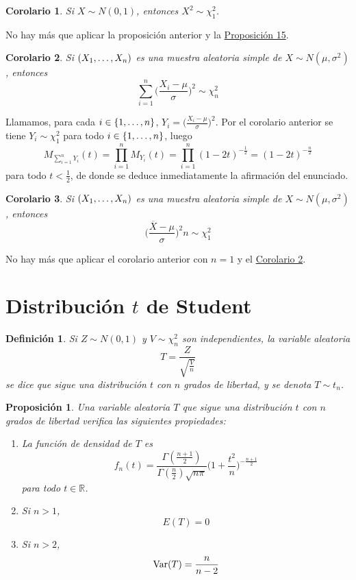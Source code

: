 \documentclass[11pt]{report}
\makeatletter
\renewenvironment{proof}[1][\proofname]{\par
  \pushQED{\qed}%
  \normalfont \topsep\z@skip %
  \trivlist
  \item[\hskip\labelsep
        \itshape
    #1\@addpunct{.}]\ignorespaces
}{%
  \popQED\endtrivlist\@endpefalse
}
\newtheorem{proposition}{Proposición}
\newtheorem{corollary}{Corolario} %
\newtheorem{definition}{Definición}
\theoremstyle{definition}
\newcommand{\R}{\mathbb R}
\makeatother
\begin{document}
\begin{corollary}
Si $X \sim N(0,1)$, entonces $X^2 \sim \chi^2_1$.
\end{corollary}

\begin{proof}
No hay más que aplicar la proposición anterior y la \hyperref[prop2.11]{\color{blue}Proposición 15}.
\end{proof}

\begin{corollary}
\label{cor2.17}
Si $(X_1,\mathellipsis,X_n)$ es una muestra aleatoria simple de $X \sim N(\mu,\sigma^2)$, entonces
    \[\sum_{i=1}^n\bigl(\frac{X_i-\mu}{\sigma}\bigr)^2 \sim \chi^2_n\]
\end{corollary}

\begin{proof}
Llamamos, para cada $i \in \{1,\mathellipsis,n\}$, $Y_i = \bigl(\frac{X_i-\mu}{\sigma}\bigr)^2$. Por el corolario anterior se tiene $Y_i\sim \chi^2_1$ para todo $i \in \{1,\mathellipsis,n\}$, luego
\[M_{\sum_{i=1}^nY_i}(t) = \prod_{i=1}^nM_{Y_i}(t)= \prod_{i=1}^n(1-2t)^{-\frac{1}{2}} = (1-2t)^{-\frac{n}{2}}\]
para todo $t < \frac{1}{2}$, de donde se deduce inmediatamente la afirmación del enunciado.
\end{proof}

\begin{corollary}
\label{cor2.18}
Si $(X_1,\mathellipsis,X_n)$ es una muestra aleatoria simple de $X \sim N(\mu,\sigma^2)$, entonces
\[\bigl(\frac{\overline{X}-\mu}{\sigma}\bigr)^2n \sim \chi^2_1\]
\end{corollary}

\begin{proof}
No hay más que aplicar el corolario anterior con $n=1$ y el \hyperref[cor2.6]{\color{blue}Corolario 2}.
\end{proof}

\section{Distribución \texorpdfstring{$t$}{TEXT} de Student}

\begin{definition}
Si $Z \sim N(0,1)$ y $V \sim \chi^2_n$ son independientes, la variable aleatoria
\[T= \frac{Z}{\sqrt{\frac{V}{n}}}\]
se dice que sigue una \emph{distribución $t$ con $n$ grados de libertad}, y se denota $T \sim t_n$.
\end{definition}

\begin{proposition}
Una variable aleatoria $T$ que sigue una distribución $t$ con $n$ grados de libertad verifica las siguientes propiedades:
\begin{enumerate}
    \item La función de densidad de $T$ es
\[f_n(t) = \frac{\Gamma(\frac{n+1}{2})}{\Gamma(\frac{n}{2})\sqrt{n\pi}}\bigl(1+\frac{t^2}{n}\bigr)^{-\frac{n+1}{2}}\]
para todo $t \in \R$.
\item Si $n>1$,
\[E(T) = 0\]
\item Si $n>2$,
\[\textup{Var}(T) = \frac{n}{n-2}\]
\end{enumerate}
\end{proposition}
\end{document}
